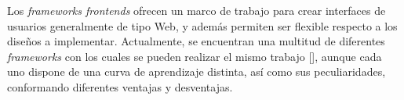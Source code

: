 


Los \textit{frameworks frontends} ofrecen un marco de trabajo para crear interfaces de usuarios generalmente de tipo Web, y además permiten ser flexible respecto a los diseños a implementar. Actualmente, se encuentran una multitud de diferentes \textit{frameworks} con los cuales se pueden realizar el mismo trabajo [\cite{48,53}], aunque cada uno dispone de una curva de aprendizaje distinta, así como sus peculiaridades, conformando diferentes ventajas y desventajas.

